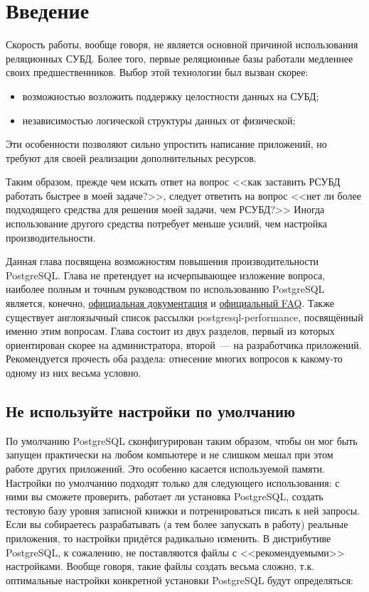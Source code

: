 \section{Введение}

Скорость работы, вообще говоря, не является основной причиной использования реляционных СУБД. Более того, первые реляционные базы работали медленнее своих предшественников. Выбор этой технологии был вызван скорее:

\begin{itemize}
  \item возможностью возложить поддержку целостности данных на СУБД;
  \item независимостью логической структуры данных от физической;
\end{itemize}

Эти особенности позволяют сильно упростить написание приложений, но требуют для своей реализации дополнительных ресурсов.

Таким образом, прежде чем искать ответ на вопрос <<как заставить РСУБД работать быстрее в моей задаче?>>, следует ответить на вопрос <<нет ли более подходящего средства для решения моей задачи, чем РСУБД?>> Иногда использование другого средства потребует меньше усилий, чем настройка производительности.

Данная глава посвящена возможностям повышения производительности PostgreSQL. Глава не претендует на исчерпывающее изложение вопроса, наиболее полным и точным руководством по использованию PostgreSQL является, конечно, \href{https://www.postgresql.org/docs/}{официальная документация} и \href{https://wiki.postgresql.org/wiki/Category:FAQ}{официальный FAQ}. Также существует англоязычный список рассылки postgresql-performance, посвящённый именно этим вопросам. Глава состоит из двух разделов, первый из которых ориентирован скорее на администратора, второй~--- на разработчика приложений. Рекомендуется прочесть оба раздела: отнесение многих вопросов к какому-то одному из них весьма условно.


\subsection{Не используйте настройки по умолчанию}

По умолчанию PostgreSQL сконфигурирован таким образом, чтобы он мог быть запущен практически на любом компьютере и не слишком мешал при этом работе других приложений. Это особенно касается используемой памяти. Настройки по умолчанию подходят только для следующего использования: с ними вы сможете проверить, работает ли установка PostgreSQL, создать тестовую базу уровня записной книжки и потренироваться писать к ней запросы. Если вы собираетесь разрабатывать (а тем более запускать в работу) реальные приложения, то настройки придётся радикально изменить. В дистрибутиве PostgreSQL, к сожалению, не поставляются файлы с <<рекомендуемыми>> настройками. Вообще говоря, такие файлы создать весьма сложно, т.к. оптимальные настройки конкретной установки PostgreSQL будут определяться:

